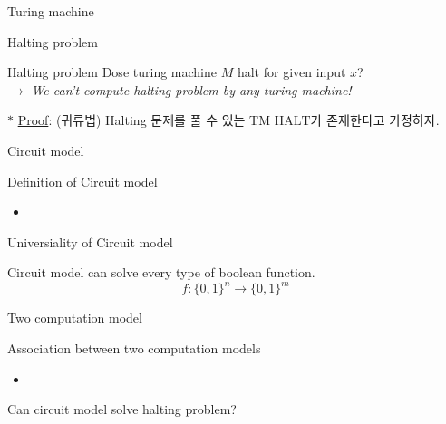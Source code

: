 \documentclass[9pt]{beamer}
\begin{document}
\begin{section}{Turing machine}
        \begin{frame}{Halting problem}
            \begin{alertblock}{Halting problem}
                Dose turing machine $M$ halt for given input $x$?
                \\ $\rightarrow$ \textit{We can't compute halting problem by any turing machine!}
            \end{alertblock}
            \vspace{0.2cm}
            $\ast$ \underline{Proof}:
            (귀류법) Halting 문제를 풀 수 있는 TM $\text{HALT}$가 존재한다고 가정하자.
            \vspace{5cm}

        \end{frame}

    \end{section}


    \begin{section}{Circuit model}
        \begin{frame}{Definition of Circuit model}
            \begin{itemize}
                \item 
            \end{itemize}
        \end{frame}

        \begin{frame}{Universiality of Circuit model}
            \begin{theorem}
                Circuit model can solve every type of boolean function.
                $$f : \{0, 1\}^n \rightarrow \{0, 1\}^m$$
            \end{theorem}
        \end{frame}
    \end{section}

    \begin{section}{Two computation model}
        \begin{frame}{Association between two computation models}
            \begin{definition}
                
            \end{definition}
            \begin{itemize}
                \item 
            \end{itemize}
            \begin{alertblock}{Can circuit model solve halting problem?}
                
            \end{alertblock}
        \end{frame}
    \end{section}
\end{document}
